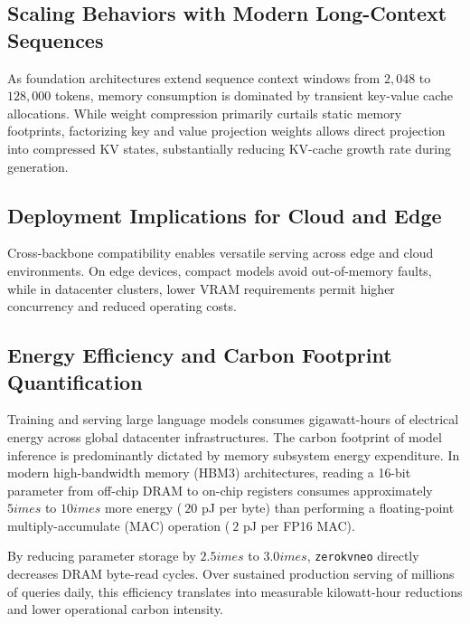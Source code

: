 \subsection{Scaling Behaviors with Modern Long-Context Sequences}
As foundation architectures extend sequence context windows from $2{,}048$ to $128{,}000$ tokens, memory consumption is dominated by transient key-value cache allocations. While weight compression primarily curtails static memory footprints, factorizing key and value projection weights allows direct projection into compressed KV states, substantially reducing KV-cache growth rate during generation.

\subsection{Deployment Implications for Cloud and Edge}
Cross-backbone compatibility enables versatile serving across edge and cloud environments. On edge devices, compact models avoid out-of-memory faults, while in datacenter clusters, lower VRAM requirements permit higher concurrency and reduced operating costs.

\subsection{Energy Efficiency and Carbon Footprint Quantification}
Training and serving large language models consumes gigawatt-hours of electrical energy across global datacenter infrastructures. The carbon footprint of model inference is predominantly dictated by memory subsystem energy expenditure. In modern high-bandwidth memory (HBM3) architectures, reading a 16-bit parameter from off-chip DRAM to on-chip registers consumes approximately $5	imes$ to $10	imes$ more energy ($~20$ pJ per byte) than performing a floating-point multiply-accumulate (MAC) operation ($~2$ pJ per FP16 MAC).

By reducing parameter storage by $2.5	imes$ to $3.0	imes$, \texttt{zerokvneo} directly decreases DRAM byte-read cycles. Over sustained production serving of millions of queries daily, this efficiency translates into measurable kilowatt-hour reductions and lower operational carbon intensity.
